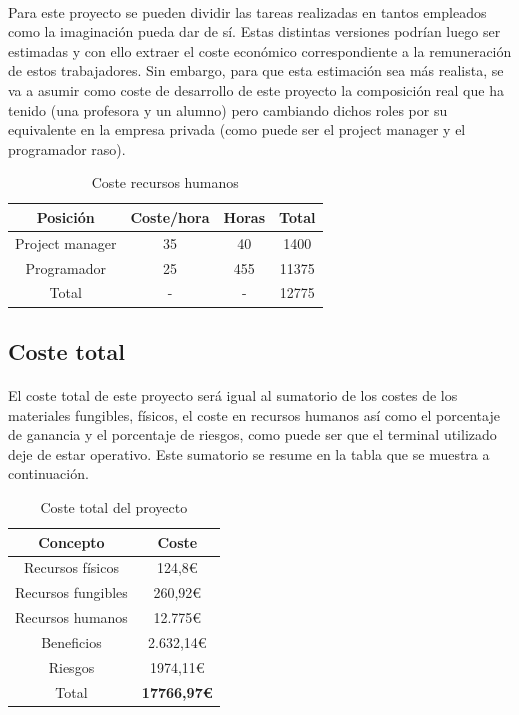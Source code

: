 \documentclass{article}
\begin{document}
\paragraph{}
Para este proyecto se pueden dividir las tareas realizadas en tantos empleados como la imaginación pueda dar de sí. Estas distintas versiones podrían luego ser estimadas y con ello extraer el coste económico correspondiente a la remuneración de estos trabajadores. Sin embargo, para que esta estimación sea más realista, se va a asumir como coste de desarrollo de este proyecto la composición real que ha tenido (una profesora y un alumno) pero cambiando dichos roles por su equivalente en la empresa privada (como puede ser el project manager y el programador raso).

\begin{table}[H]
\centering
\caption{Coste recursos humanos}
\label{my-label}
\begin{tabular}{|c|c|c|c|}
\hline
\textbf{Posición} & \textbf{Coste/hora} & \textbf{Horas} & \textbf{Total} \\ \hline
Project manager   & 35                  & 40             & 1400           \\ \hline
Programador       & 25                  & 455            & 11375          \\ \hline
Total             & -                   & -              & 12775          \\ \hline
\end{tabular}
\end{table}

\subsection{Coste total}

\paragraph{}
El coste total de este proyecto será igual al sumatorio de los costes de los materiales fungibles, físicos, el coste en recursos humanos así como el porcentaje de ganancia y el porcentaje de riesgos, como puede ser que el terminal utilizado deje de estar operativo. Este sumatorio se resume en la tabla que se muestra a continuación.

\begin{table}[H]
\centering
\caption{Coste total del proyecto}
\label{my-label}
\begin{tabular}{|c|c|}
\hline
\textbf{Concepto}  & \textbf{Coste} \\ \hline
Recursos físicos   & 124,8\euro          \\ \hline
Recursos fungibles & 260,92\euro         \\ \hline
Recursos humanos   & 12.775\euro         \\ \hline
Beneficios         & 2.632,14\euro       \\ \hline
Riesgos            & 1974,11\euro        \\ \hline
Total              & \textbf{17766,97\euro}       \\ \hline
\end{tabular}
\end{table}
\end{document}
